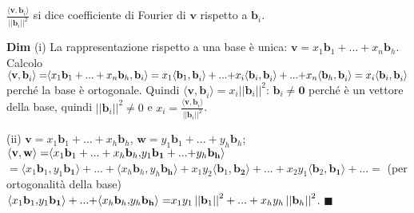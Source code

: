 \documentclass{article}
\begin{document}
$\frac{\langle \mathbf{v,b}_{i}\mathbf{\rangle }}{\left\vert \left\vert 
\mathbf{b}_{i}\right\vert \right\vert ^{2}}$ si dice coefficiente di Fourier
di $\mathbf{v}$ rispetto a $\mathbf{b}_{i}$.

\textbf{Dim} (i) La rappresentazione rispetto a una base \`{e} unica: $%
\mathbf{v}=x_{1}\mathbf{b}_{1}+...+x_{n}\mathbf{b}_{h}$. Calcolo $\langle 
\mathbf{v,b}_{i}\mathbf{\rangle =}\langle x_{1}\mathbf{b}_{1}+...+x_{n}%
\mathbf{b}_{h},\mathbf{b}_{i}\rangle =x_{1}\langle \mathbf{b}_{1}\mathbf{,b}%
_{i}\mathbf{\rangle +...+}x_{i}\langle \mathbf{b}_{i}\mathbf{,b}_{i}\mathbf{%
\rangle +...+}x_{n}\langle \mathbf{b}_{h}\mathbf{,b}_{i}\mathbf{\rangle }%
=x_{i}\langle \mathbf{b}_{i}\mathbf{,b}_{i}\mathbf{\rangle }$ perch\'{e} la
base \`{e} ortogonale. Quindi $\langle \mathbf{v,b}_{i}\mathbf{\rangle }%
=x_{i}\left\vert \left\vert \mathbf{b}_{i}\right\vert \right\vert ^{2}$: $%
\mathbf{b}_{i}\neq \mathbf{0}$ perch\'{e} \`{e} un vettore della base,
quindi $\left\vert \left\vert \mathbf{b}_{i}\right\vert \right\vert ^{2}\neq
0$ e $x_{i}=\frac{\langle \mathbf{v,b}_{i}\mathbf{\rangle }}{\left\vert
\left\vert \mathbf{b}_{i}\right\vert \right\vert ^{2}}$.

(ii) $\mathbf{v}=x_{1}\mathbf{b}_{1}+...+x_{h}\mathbf{b}_{h}$, $\mathbf{w}%
=y_{1}\mathbf{b}_{1}+...+y_{h}\mathbf{b}_{h}$; $\langle \mathbf{v,w\rangle =}%
\langle x_{1}\mathbf{b}_{1}+...+x_{h}\mathbf{b}_{h}\mathbf{,}y_{1}\mathbf{%
\mathbf{b}_{1}+...+}y_{h}\mathbf{\mathbf{b}_{h}\rangle }$ $\mathbf{=}\langle
x_{1}\mathbf{b}_{1}\mathbf{,}y_{1}\mathbf{\mathbf{b}_{1}\rangle +...+}%
\langle x_{h}\mathbf{b}_{h}\mathbf{,}y_{h}\mathbf{\mathbf{b}_{h}\rangle +}%
x_{1}y_{2}\langle \mathbf{b}_{1}\mathbf{,\mathbf{b}_{2}\rangle +...+}%
x_{2}y_{1}\langle \mathbf{b}_{2}\mathbf{,\mathbf{b}_{1}\rangle +...=}$ (per
ortogonalit\`{a} della base) $\langle x_{1}\mathbf{b}_{1}\mathbf{,}y_{1}%
\mathbf{\mathbf{b}_{1}\rangle +...+}\langle x_{h}\mathbf{b}_{h}\mathbf{,}%
y_{h}\mathbf{\mathbf{b}_{h}\rangle =}x_{1}y_{1}\left\vert \left\vert \mathbf{%
b}_{1}\right\vert \right\vert ^{2}+...+x_{h}y_{h}\left\vert \left\vert 
\mathbf{b}_{h}\right\vert \right\vert ^{2}$. $\blacksquare $
\end{document}
